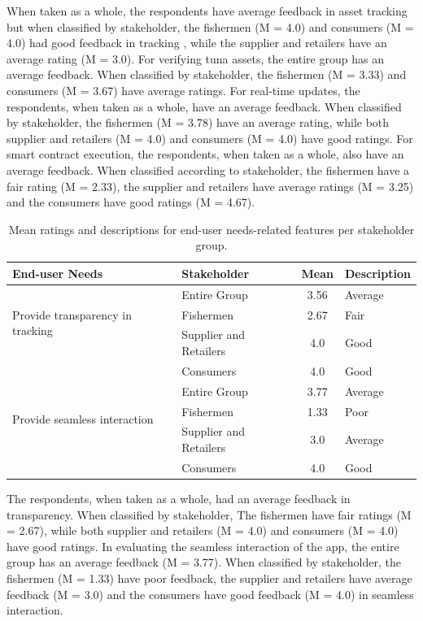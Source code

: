 When taken as a whole, the respondents have average feedback in asset tracking but when classified by stakeholder, the fishermen (M = 4.0) and consumers (M = 4.0) had good feedback in tracking , while the supplier and retailers have an average rating (M = 3.0). For verifying tuna assets, the entire group has an average feedback. When classified by stakeholder, the fishermen (M = 3.33) and consumers (M = 3.67) have average ratings.  For real-time updates, the respondents, when taken as a whole, have an average feedback. When classified by stakeholder, the fishermen (M = 3.78) have an average rating, while both supplier and retailers (M = 4.0) and consumers (M = 4.0) have good ratings. For smart contract execution, the respondents, when taken as a whole, also have an average feedback. When classified according to stakeholder, the fishermen have a fair rating (M = 2.33), the supplier and retailers have average ratings (M = 3.25) and the consumers have good ratings (M = 4.67).

\begin{table}[h]
	\centering
	\begin{tabular}{|l|l|c|l|}
		\hline
		\textbf{End-user Needs} & \textbf{Stakeholder} & \textbf{Mean} & \textbf{Description} \\ \hline
		\multirow{3}{*}{Provide transparency in tracking} 
		& Entire Group & 3.56 & Average \\ \cline{2-4}
		& Fishermen & 2.67 & Fair \\ \cline{2-4}
		& Supplier and Retailers & 4.0 & Good \\ \cline{2-4}
		& Consumers & 4.0 & Good \\ \hline
		
		\multirow{3}{*}{Provide seamless interaction} 
		& Entire Group & 3.77 & Average \\ \cline{2-4}
		& Fishermen & 1.33 & Poor \\ \cline{2-4}
		& Supplier and Retailers & 3.0 & Average \\ \cline{2-4}
		& Consumers & 4.0 & Good \\ \hline
		
	\end{tabular}
	\caption{Mean ratings and descriptions for end-user needs-related features per stakeholder group.}
	\label{tab:end-user}
\end{table}

The respondents, when taken as a whole, had an average feedback in transparency. When classified by stakeholder, The fishermen have fair ratings (M = 2.67), while both supplier and retailers (M = 4.0) and consumers (M = 4.0) have good ratings. In evaluating the seamless interaction of the app, the entire group has an average feedback (M = 3.77). When classified by stakeholder, the fishermen (M = 1.33) have poor feedback, the supplier and retailers have average feedback (M = 3.0) and the consumers have good feedback (M = 4.0) in seamless interaction.

